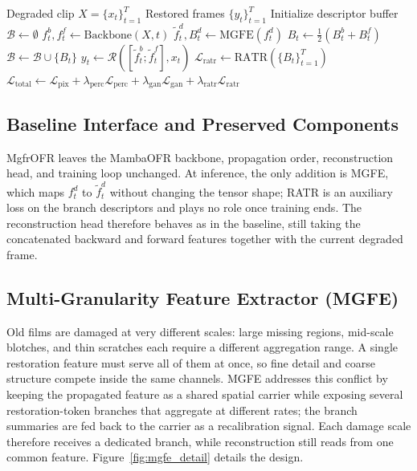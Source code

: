 \begin{algorithm}[H]
\caption{MgfrOFR forward pass for a clip of length $T$.\label{alg:mgfrofr}}
\begin{algorithmic}[1]
\Require Degraded clip $X=\{x_t\}_{t=1}^{T}$
\Ensure Restored frames $\{y_t\}_{t=1}^{T}$
\State Initialize descriptor buffer $\mathcal{B} \leftarrow \emptyset$
    \State $f_t^{b}, f_t^{f} \leftarrow \text{Backbone}(X, t)$ 
        \State $\widetilde{f}_t^{d}, B_t^{d} \leftarrow \text{MGFE}(f_t^{d})$ 
    \EndFor
    \State $B_t \leftarrow \frac{1}{2}(B_t^{b} + B_t^{f})$ 
    \State $\mathcal{B} \leftarrow \mathcal{B} \cup \{B_t\}$ 
    \State $y_t \leftarrow \mathcal{R}([\widetilde{f}_t^{b}; \widetilde{f}_t^{f}], x_t)$ 
\EndFor
{}
    \State $\mathcal{L}_{\text{ratr}} \leftarrow \text{RATR}(\{B_t\}_{t=1}^{T})$ 
    \State $\mathcal{L}_{\text{total}} \leftarrow \mathcal{L}_{\text{pix}} + \lambda_{\text{perc}}\mathcal{L}_{\text{perc}} + \lambda_{\text{gan}}\mathcal{L}_{\text{gan}} + \lambda_{\text{ratr}}\mathcal{L}_{\text{ratr}}$
\EndIf
\end{algorithmic}
\end{algorithm}

\subsection{Baseline Interface and Preserved Components}
\label{subsec:baseline_interface}

MgfrOFR leaves the MambaOFR backbone, propagation order, reconstruction head, and training loop unchanged. At inference, the only addition is MGFE, which maps $f_t^{d}$ to $\widetilde{f}_t^{d}$ without changing the tensor shape; RATR is an auxiliary loss on the branch descriptors and plays no role once training ends. The reconstruction head therefore behaves as in the baseline, still taking the concatenated backward and forward features together with the current degraded frame.

\subsection{Multi-Granularity Feature Extractor (MGFE)}
\label{subsec:mgfe}

Old films are damaged at very different scales: large missing regions, mid-scale blotches, and thin scratches each require a different aggregation range. A single restoration feature must serve all of them at once, so fine detail and coarse structure compete inside the same channels. MGFE addresses this conflict by keeping the propagated feature as a shared spatial carrier while exposing several restoration-token branches that aggregate at different rates; the branch summaries are fed back to the carrier as a recalibration signal. Each damage scale therefore receives a dedicated branch, while reconstruction still reads from one common feature. Figure~\ref{fig:mgfe_detail} details the design.

